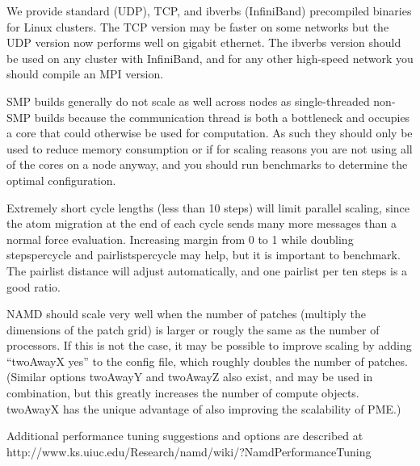 We provide standard (UDP), TCP, and ibverbs (InfiniBand) precompiled
binaries for Linux clusters.  The TCP version may be faster on some
networks but the UDP version now performs well on gigabit ethernet.
The ibverbs version should be used on any cluster with InfiniBand,
and for any other high-speed network you should compile an MPI version.

SMP builds generally do not scale as well across nodes as single-threaded
non-SMP builds because the communication thread is both a bottleneck and
occupies a core that could otherwise be used for computation.  As such
they should only be used to reduce memory consumption or if for scaling
reasons you are not using all of the cores on a node anyway, and you
should run benchmarks to determine the optimal configuration.

Extremely short cycle lengths (less than 10 steps) will limit parallel
scaling, since the atom migration at the end of each cycle sends many
more messages than a normal force evaluation.  Increasing margin from
0 to 1 while doubling stepspercycle and pairlistspercycle may help,
but it is important to benchmark.  The pairlist distance will adjust
automatically, and one pairlist per ten steps is a good ratio.

NAMD should scale very well when the number of patches (multiply the
dimensions of the patch grid) is larger or rougly the same as the
number of processors.  If this is not the case, it may be possible
to improve scaling by adding ``twoAwayX yes'' to the config file,
which roughly doubles the number of patches.  (Similar options
twoAwayY and twoAwayZ also exist, and may be used in combination,
but this greatly increases the number of compute objects.  twoAwayX
has the unique advantage of also improving the scalability of PME.)
  

Additional performance tuning suggestions and options are described
at http://www.ks.uiuc.edu/Research/namd/wiki/?NamdPerformanceTuning

